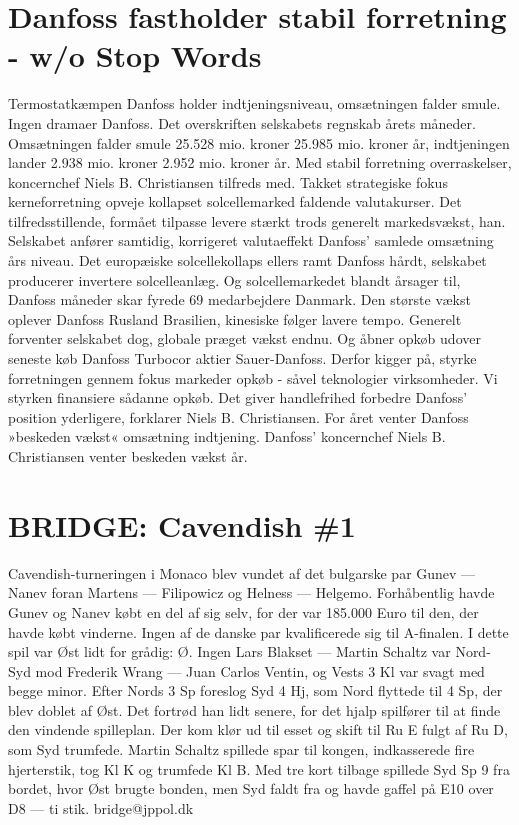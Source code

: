 \section{Danfoss fastholder stabil forretning - w/o Stop Words}
\label{Lemvig1:textFiltered}
Termostatkæmpen Danfoss holder indtjeningsniveau, omsætningen falder smule. 	Ingen dramaer Danfoss. 	Det overskriften selskabets regnskab årets måneder. Omsætningen falder smule 25.528 mio. kroner 25.985 mio. kroner år, indtjeningen lander 2.938 mio. kroner 2.952 mio. kroner år. 	Med stabil forretning overraskelser, koncernchef Niels B. Christiansen tilfreds med. 	Takket strategiske fokus kerneforretning opveje kollapset solcellemarked faldende valutakurser. Det tilfredsstillende, formået tilpasse levere stærkt trods generelt markedsvækst, han. 	Selskabet anfører samtidig, korrigeret valutaeffekt Danfoss' samlede omsætning års niveau. 	Det europæiske solcellekollaps ellers ramt Danfoss hårdt, selskabet producerer invertere solcelleanlæg. Og solcellemarkedet blandt årsager til, Danfoss måneder skar fyrede 69 medarbejdere Danmark. 	Den største vækst oplever Danfoss Rusland Brasilien, kinesiske følger lavere tempo. Generelt forventer selskabet dog, globale præget vækst endnu. Og åbner opkøb udover seneste køb Danfoss Turbocor aktier Sauer-Danfoss. 	Derfor kigger på, styrke forretningen gennem fokus markeder opkøb - såvel teknologier virksomheder. Vi styrken finansiere sådanne opkøb. Det giver handlefrihed forbedre Danfoss' position yderligere, forklarer Niels B. Christiansen. 	For året venter Danfoss »beskeden vækst« omsætning indtjening. 	Danfoss' koncernchef Niels B. Christiansen venter beskeden vækst år. 

\section{BRIDGE: Cavendish \#1}
\label{JPPOLHighestMatch1}
Cavendish-turneringen i Monaco blev vundet af det bulgarske par Gunev — Nanev foran Martens — Filipowicz og Helness — Helgemo. Forhåbentlig havde Gunev og Nanev købt en del af sig selv, for der var 185.000 Euro til den, der havde købt vinderne. Ingen af de danske par kvalificerede sig til A-finalen. I dette spil var Øst lidt for grådig: Ø. Ingen Lars Blakset — Martin Schaltz var Nord-Syd mod Frederik Wrang — Juan Carlos Ventin, og Vests 3 Kl var svagt med begge minor. Efter Nords 3 Sp foreslog Syd 4 Hj, som Nord flyttede til 4 Sp, der blev doblet af Øst. Det fortrød han lidt senere, for det hjalp spilfører til at finde den vindende spilleplan. Der kom klør ud til esset og skift til Ru E fulgt af Ru D, som Syd trumfede. Martin Schaltz spillede spar til kongen, indkasserede fire hjerterstik, tog Kl K og trumfede Kl B. Med tre kort tilbage spillede Syd Sp 9 fra bordet, hvor Øst brugte bonden, men Syd faldt fra og havde gaffel på E10 over D8 — ti stik. bridge@jppol.dk

